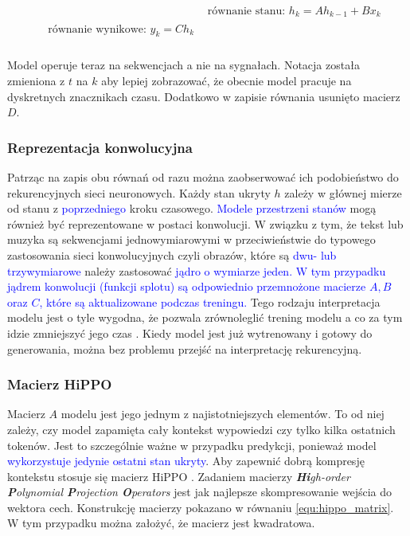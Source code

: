 \documentclass[data-science]{agh-wi} %
\begin{document}
\begin{align}
     & \text{równanie stanu: }h_k = Ah_{k-1} + Bx_k \label{equ:rownanie_stanu_seq} \\
    \begin{split}
        &\text{równanie wynikowe: }y_k = Ch_k \label{equ:rownanie_wynikowe_seq} \\
    \end{split}
\end{align}

Model operuje teraz na sekwencjach a nie na sygnałach. Notacja została zmieniona z $t$ na $k$ aby lepiej zobrazować, że obecnie model pracuje na dyskretnych znacznikach czasu. Dodatkowo w zapisie równania usunięto macierz $D$.

\subsubsection*{Reprezentacja konwolucyjna}
Patrząc na zapis obu równań od razu można zaobserwować ich podobieństwo do rekurencyjnych sieci neuronowych. Każdy stan ukryty $h$ zależy w głównej mierze od stanu z \textcolor{blue}{poprzedniego} kroku czasowego. \textcolor{blue}{Modele przestrzeni stanów} mogą również być reprezentowane w postaci konwolucji. W związku z tym, że tekst lub muzyka są sekwencjami jednowymiarowymi w przeciwieństwie do typowego zastosowania sieci konwolucyjnych czyli obrazów, które są \textcolor{blue}{dwu- lub trzywymiarowe} należy zastosować \textcolor{blue}{jądro o wymiarze jeden. W tym przypadku jądrem konwolucji (funkcji splotu) są odpowiednio przemnożone macierze $A, B$ oraz $C$, które są aktualizowane podczas treningu.} Tego rodzaju interpretacja modelu jest o tyle wygodna, że pozwala zrównoleglić trening modelu a co za tym idzie zmniejszyć jego czas \cite{ssm_notacja}. Kiedy model jest już wytrenowany i gotowy do generowania, można bez problemu przejść na interpretację rekurencyjną.

\subsubsection*{Macierz HiPPO}
Macierz $A$ modelu jest jego jednym z najistotniejszych elementów. To od niej zależy, czy model zapamięta cały kontekst wypowiedzi czy tylko kilka ostatnich tokenów. Jest to szczególnie ważne w przypadku predykcji, ponieważ model \textcolor{blue}{wykorzystuje jedynie ostatni stan ukryty}. Aby zapewnić dobrą kompresję kontekstu stosuje się macierz HiPPO \cite{hippo}. Zadaniem macierzy \textit{\textbf{Hi}gh-order \textbf{P}olynomial \textbf{P}rojection \textbf{O}perators} jest jak najlepsze skompresowanie wejścia do wektora cech. Konstrukcję macierzy pokazano w równaniu \ref*{equ:hippo_matrix}. W tym przypadku można założyć, że macierz jest kwadratowa.
\end{document}
